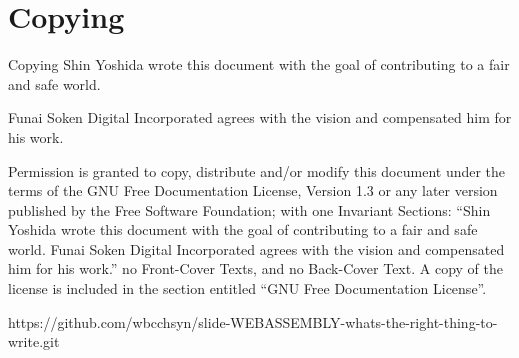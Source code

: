 %
%

\section{Copying}


\begin{frame}{Copying}
    Shin Yoshida wrote this document with the goal of contributing to a fair and safe world.
    \vspace{2ex}

    Funai Soken Digital Incorporated agrees with the vision and compensated him for his work.
    \vspace{2ex}

    {\tiny
    Permission is granted to copy, distribute and/or modify this
    document under the terms of the GNU Free Documentation License,
    Version 1.3 or any later version published by the Free Software
    Foundation; with one Invariant Sections:
    ``Shin Yoshida wrote this document with the goal of contributing to a fair and safe world.
    Funai Soken Digital Incorporated agrees with the vision and compensated him for his work.''
    no Front-Cover Texts, and no Back-Cover Text. A copy of the license is
    included in the section entitled ``GNU Free Documentation License''.

    https://github.com/wbcchsyn/slide-WEBASSEMBLY-whats-the-right-thing-to-write.git
    }
\end{frame}
